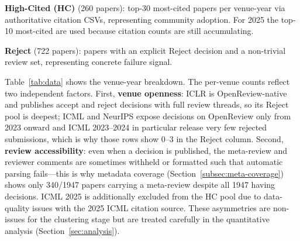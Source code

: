 \documentclass[10pt,a4paper]{article}
\begin{document}
\textbf{\textcolor{cgold}{High-Cited (HC)}} (260 papers): top-30 most-cited papers per venue-year via authoritative citation CSVs, representing community adoption. For 2025 the top-10 most-cited are used because citation counts are still accumulating.

\textbf{\textcolor{cred}{Reject}} (722 papers): papers with an explicit Reject decision and a non-trivial review set, representing concrete failure signal.

Table~\ref{tab:data} shows the venue-year breakdown. The per-venue counts reflect two independent factors. First, \textbf{venue openness}: ICLR is OpenReview-native and publishes accept and reject decisions with full review threads, so its Reject pool is deepest; ICML and NeurIPS expose decisions on OpenReview only from 2023 onward and ICML 2023--2024 in particular release very few rejected submissions, which is why those rows show 0--3 in the Reject column. Second, \textbf{review accessibility}: even when a decision is published, the meta-review and reviewer comments are sometimes withheld or formatted such that automatic parsing fails---this is why metadata coverage (Section~\ref{subsec:meta-coverage}) shows only 340/1947 papers carrying a meta-review despite all 1947 having decisions. ICML 2025 is additionally excluded from the HC pool due to data-quality issues with the 2025 ICML citation source. These asymmetries are non-issues for the clustering stage but are treated carefully in the quantitative analysis (Section~\ref{sec:analysis}).
\end{document}
